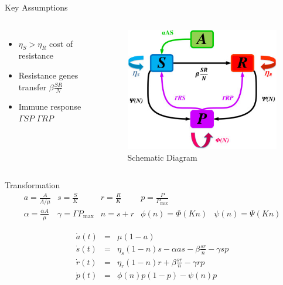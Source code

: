 \documentclass{beamer}
\begin{document}
\begin{frame}{Key Assumptions}
  \begin{columns}
  \begin{itemize}
    \item $\eta_S > \eta_R$ cost of resistance
    \item Resistance genes transfer $\beta\frac{SR}{N}$
    \item Immune response $\Gamma S P$ $\Gamma R P$
  \end{itemize}
    \begin{figure}
        \includegraphics[width=\textwidth]{1-s2.0-S1007570424005975-gr1.jpg}
        \caption{Schematic Diagram \cite{MOSTEFAOUI2025108412}}
    \end{figure}
    \end{columns}
\end{frame}


\begin{frame}{Transformation}
\vspace{-20mm}
\[ 
  \begin{array}{ccccc}
    a = \frac{A}{A/\mu} & s = \frac{S}{K} & r = \frac{R}{K} & p = \frac{P}{P_{\max}} & \\
    \alpha = \frac{\bar{\alpha}A}{\mu} & \gamma = \Gamma P_{\max} & n = s + r & \phi(n) = \Phi(Kn) & \psi(n) = \Psi(Kn)
  \end{array}
\]

\vspace{-10mm}

\begin{eqnarray*}
    \dot{a}(t) & = & \mu(1 - a)  \\
    \dot{s}(t) & = & \eta_s(1 - n)s - \alpha as - \beta \frac{sr}{n} - \gamma sp \\
    \dot{r}(t) & = & \eta_r(1 - n)r + \beta \frac{sr}{n} - \gamma rp \\
    \dot{p}(t) & = & \phi(n)p(1 - p) - \psi(n)p 
\end{eqnarray*}

\end{frame}
\end{document}

